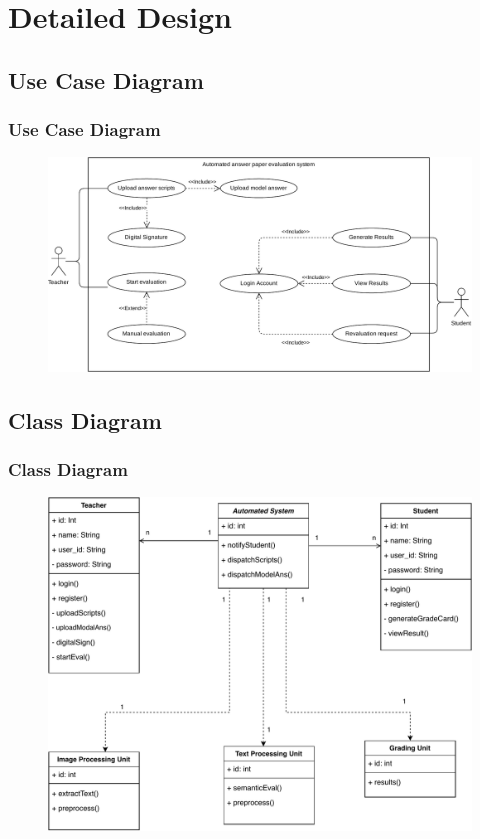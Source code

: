 \section{Detailed Design}
\subsection{Use Case Diagram}
\begin{frame}
    \frametitle{Use Case Diagram}
    \begin{figure}[!h]
        \centering
        \includegraphics[scale=0.45]{images/use-case.pdf}
    \end{figure}
\end{frame}

\subsection{Class Diagram}
\begin{frame}
    \frametitle{Class Diagram}
    \begin{figure}[!h]
        \centering
        \includegraphics[scale=0.45]{images/class.pdf}
    \end{figure}
\end{frame}

